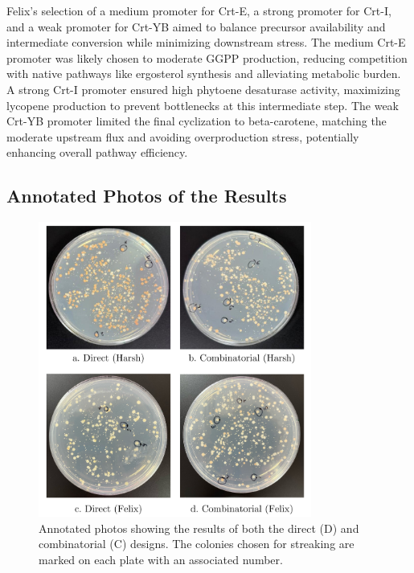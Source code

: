 \documentclass[12pt,a4paper]{article}
\begin{document}
Felix's selection of a medium promoter for Crt-E, a strong promoter for Crt-I,
and a weak promoter for Crt-YB aimed to balance precursor availability and
intermediate conversion while minimizing downstream stress. The medium Crt-E
promoter was likely chosen to moderate GGPP production, reducing competition
with native pathways like ergosterol synthesis and alleviating metabolic
burden. A strong Crt-I promoter ensured high phytoene desaturase activity,
maximizing lycopene production to prevent bottlenecks at this intermediate
step. The weak Crt-YB promoter limited the final cyclization to beta-carotene,
matching the moderate upstream flux and avoiding overproduction stress,
potentially enhancing overall pathway efficiency.

\newpage
\subsection{Annotated Photos of the Results}
\begin{figure}[h!]
    \centering
    \includegraphics[width=0.8\textwidth]{figures/direct_and_combinatorial.png}
    \caption{Annotated photos showing the results of both the direct (D) and combinatorial (C) designs. The colonies chosen for streaking are marked on each plate with an associated number.}\label{fig:direct_comb_results}
\end{figure}
\end{document}
